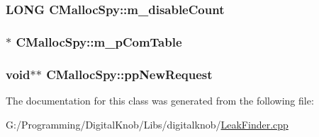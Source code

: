 \hypertarget{class_c_malloc_spy_a8401d7211c8004b55c27d5432aad67b7}{
\subsubsection[{m\-\_\-disable\-Count}]{\setlength{\rightskip}{0pt plus 5cm}L\-O\-N\-G C\-Malloc\-Spy\-::m\-\_\-disable\-Count\hspace{0.3cm}{\ttfamily [protected]}}}\label{class_c_malloc_spy_a8401d7211c8004b55c27d5432aad67b7}
\hypertarget{class_c_malloc_spy_a6b1b65d7b9ada02385558b44c1ed3580}{
\subsubsection[{m\-\_\-p\-Com\-Table}]{$\ast$ C\-Malloc\-Spy\-::m\-\_\-p\-Com\-Table\hspace{0.3cm}{\ttfamily [protected]}}}\label{class_c_malloc_spy_a6b1b65d7b9ada02385558b44c1ed3580}
\hypertarget{class_c_malloc_spy_aebcfbe79078873befd70b2dac6027482}{
\subsubsection[{pp\-New\-Request}]{ void$\ast$$\ast$ C\-Malloc\-Spy\-::pp\-New\-Request}}\label{class_c_malloc_spy_aebcfbe79078873befd70b2dac6027482}


The documentation for this class was generated from the following file\-:\begin{DoxyCompactItemize}
\item 
G\-:/\-Programming/\-Digital\-Knob/\-Libs/digitalknob/\hyperlink{_leak_finder_8cpp}{Leak\-Finder.\-cpp}\end{DoxyCompactItemize}
